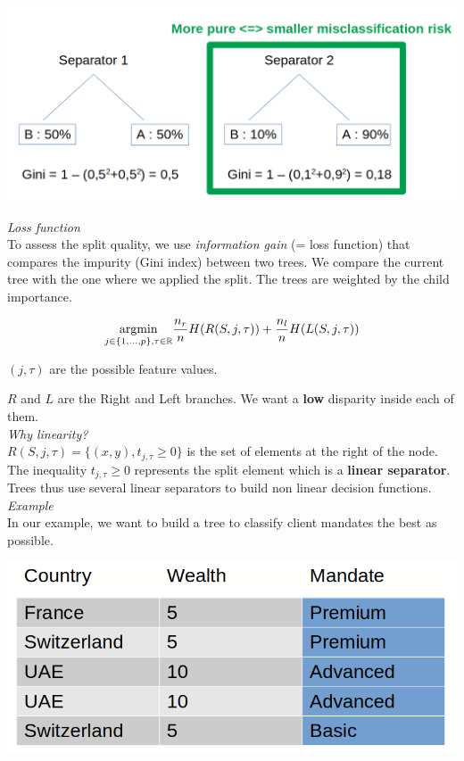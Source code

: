 \begin{center}
\includegraphics[scale=0.2]{tree_gini.png}
\end{center}

\textit{Loss function} \\

To assess the split quality, we use \textit{information gain} (= loss function) that compares the impurity (Gini index) between two trees. We compare the current tree with the one where we applied the split. The trees are weighted by the child importance.

$$\underset{j \in \{1,...,p\}, \\
\tau \in \mathbb{R}}{\operatorname{argmin}} \frac{n_r}{n}H(R(S,j,\tau))+\frac{n_l}{n}H(L(S,j,\tau))$$

$(j, \tau)$ are the possible feature values. 

$R$ and $L$ are the Right and Left branches. We want a \textbf{low} disparity inside each of them. \\

\textit{Why linearity?} \\

$R(S,j,\tau)=\{(x,y), t_{j,\tau} \ge 0\}$ is the set of elements at the right of the node. The inequality $t_{j,\tau} \ge 0$ represents the split element which is a \textbf{linear separator}. Trees thus use several linear separators to build non linear decision functions. \\

\textit{Example} \\

In our example, we want to build a tree to classify client mandates the best as possible.

\includegraphics[scale=0.2]{trees_data.png}

